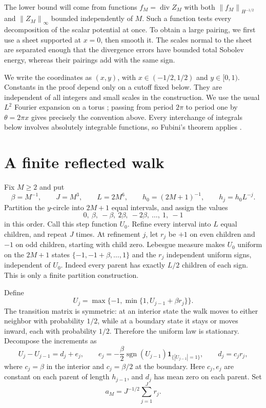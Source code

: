 \documentclass[11pt]{article}
\newcommand{\norm}[1]{\left\lVert#1\right\rVert}
\DeclareMathOperator{\diver}{div}
\begin{document}
The lower bound will come from functions $f_M=\diver Z_M$ with both
$\norm{f_M}_{H^{-1/2}}$ and $\norm{Z_M}_\infty$ bounded independently of $M$.
Such a function tests every decomposition of the scalar potential at once.
To obtain a large pairing, we first use a sheet supported at $x=0$,
then smooth it. The scales normal to the sheet are separated enough that
the divergence errors have bounded total Sobolev energy, whereas their
pairings add with the same sign.

We write the coordinates as $(x,y)$, with $x\in(-1/2,1/2)$ and
$y\in[0,1)$. Constants in the proof depend only on a cutoff fixed below.
They are independent of all integers and small scales in the construction.
We use the usual $L^2$ Fourier expansion on a torus
\cite[\S4]{Guillemin}; passing from period $2\pi$ to period one by
$\theta=2\pi x$ gives precisely the convention above. Every interchange
of integrals below involves absolutely integrable functions, so Fubini's
theorem applies \cite[Theorem~1.7.21]{Tao}.

\section{A finite reflected walk}

Fix $M\geq2$ and put
\begin{equation}\label{eq:scales}
 \beta=M^{-1},\qquad J=M^3,\qquad L=2M^6,
 \qquad h_0=(2M+1)^{-1},\qquad h_j=h_0L^{-j}.
\end{equation}
Partition the $y$-circle into $2M+1$ equal intervals, and assign the values
\[
 0,\ \beta,\ -\beta,\ 2\beta,\ -2\beta,\ \ldots,\ 1,\ -1
\]
in this order. Call this step function $U_0$. Refine every interval into
$L$ equal children, and repeat $J$ times. At refinement $j$, let $r_j$
be $+1$ on even children and $-1$ on odd children, starting with child zero.
Lebesgue measure makes $U_0$ uniform on the $2M+1$ states
$\{-1,-1+\beta,\ldots,1\}$ and the $r_j$ independent uniform signs,
independent of $U_0$. Indeed every parent has exactly $L/2$ children of
each sign. This is only a finite partition construction.

Define
\[
 U_j=\max\{-1,\min\{1,U_{j-1}+\beta r_j\}\}.
\]
The transition matrix is symmetric: at an interior state the walk moves
to either neighbor with probability $1/2$, while at a boundary state it
stays or moves inward, each with probability $1/2$. Therefore the uniform
law is stationary. Decompose the increments as
\begin{equation}\label{eq:increments}
 U_j-U_{j-1}=d_j+e_j,\qquad
 e_j=-\frac\beta2\operatorname{sgn}(U_{j-1})
                   \mathbf1_{\{|U_{j-1}|=1\}},\qquad d_j=c_jr_j,
\end{equation}
where $c_j=\beta$ in the interior and $c_j=\beta/2$ at the boundary.
Here $c_j,e_j$ are constant on each parent of length $h_{j-1}$, and
$d_j$ has mean zero on each parent. Set
\[
 a_M=J^{-1/2}\sum_{j=1}^Jr_j.
\]
\end{document}
